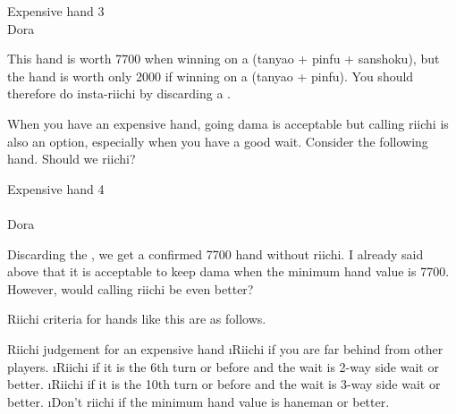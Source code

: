\bigskip
\begin{itembox}[r]{Expensive hand 3}
\bp
{}~~\bei\\
\hspace{310pt}\footnotesize{\jap Dora}
\ep
\vspace{-15pt}
\end{itembox}

\noindent This hand is worth 7700 when winning on a {\large {}} ({\jap tanyao + pinfu + sanshoku}), but the hand is worth only 2000 if winning on a {\large {}} ({\jap tanyao + pinfu}). You should therefore do insta-{\jap riichi} by discarding a {\large{}}. 

\bigskip
When you have an expensive hand, going {\jap dama} is acceptable but calling {\jap riichi} is also an option, especially when you have a good wait. Consider the following hand. Should we {\jap riichi}?

\bigskip
\begin{itembox}[r]{Expensive hand 4}
\bp
{}\\ \vspace{-18pt}
\rfs{}~~\\
\hspace{310pt}\footnotesize{\jap Dora}
\ep
\vspace{-15pt}
\end{itembox}

\noindent Discarding the {\large{}}, we get a confirmed 7700 hand without {\jap riichi}. I already said above that it is acceptable to keep {\jap dama} when the minimum hand value is 7700. However, would calling {\jap riichi} be even better? 

\bigskip
{\jap Riichi} criteria for hands like this are as follows.

\bigskip
\begin{itembox}[c]{{\jap Riichi} judgement for an expensive hand}
\bi
\i {\jap Riichi} if you are far behind from other players.
\i {\jap Riichi} if it is the 6th turn or before and the wait is 2-way side wait or better.
\i {\jap Riichi} if it is the 10th turn or before and the wait is 3-way side wait or better.
\i Don't {\jap riichi} if the minimum hand value is {\jap haneman} or better.
\ei
\vsps
\end{itembox}

